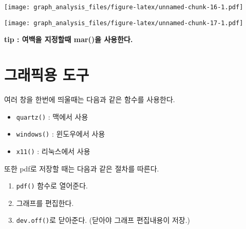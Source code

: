 \documentclass[
]{article}
\newenvironment{Shaded}{\begin{snugshade}}{\end{snugshade}}
\newcommand{\AttributeTok}[1]{\textcolor[rgb]{0.13,0.29,0.53}{#1}}
\newcommand{\DecValTok}[1]{\textcolor[rgb]{0.00,0.00,0.81}{#1}}
\newcommand{\FunctionTok}[1]{\textcolor[rgb]{0.13,0.29,0.53}{\textbf{#1}}}
\newcommand{\NormalTok}[1]{#1}
\newcommand{\SpecialCharTok}[1]{\textcolor[rgb]{0.81,0.36,0.00}{\textbf{#1}}}
\newcommand{\StringTok}[1]{\textcolor[rgb]{0.31,0.60,0.02}{#1}}
\begin{document}
\texttt{[image: graph\_analysis\_files/figure-latex/unnamed-chunk-16-1.pdf]}

\begin{Shaded}
\end{Shaded}

\texttt{[image: graph\_analysis\_files/figure-latex/unnamed-chunk-17-1.pdf]}

\textbf{tip : 여백을 지정할때 mar()을 사용한다.}

\section{그래픽용 도구}\label{uxadf8uxb798uxd53duxc6a9-uxb3c4uxad6c}

여러 창을 한번에 띄울때는 다음과 같은 함수를 사용한다.

\begin{itemize}
\item
  \texttt{quartz()} : 맥에서 사용
\item
  \texttt{windows()} : 윈도우에서 사용
\item
  \texttt{x11()} : 리눅스에서 사용
\end{itemize}

또한 pdf로 저장할 때는 다음과 같은 절차를 따른다.

\begin{enumerate}
\def\labelenumi{\arabic{enumi}.}
\item
  \texttt{pdf()} 함수로 열어준다.
\item
  그래프를 편집한다.
\item
  \texttt{dev.off()}로 닫아준다. (닫아야 그래프 편집내용이 저장.)
\end{enumerate}
\end{document}

